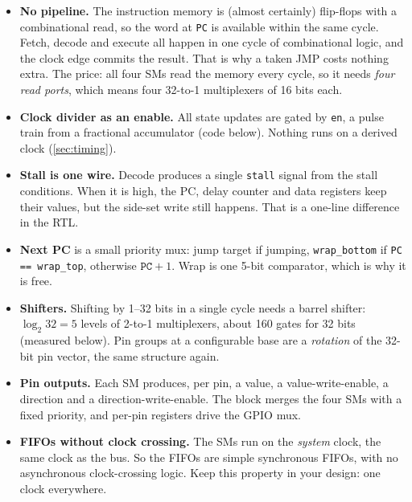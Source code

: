 \begin{itemize}
  \item \textbf{No pipeline.} The instruction memory is (almost certainly)
    flip-flops with a combinational read, so the word at \texttt{PC} is
    available within the same cycle. Fetch, decode and execute all happen
    in one cycle of combinational logic, and the clock edge commits the
    result. That is why a taken JMP costs nothing extra. The price: all
    four SMs read the memory every cycle, so it needs \emph{four read
    ports}, which means four 32-to-1 multiplexers of 16 bits each.
  \item \textbf{Clock divider as an enable.} All state updates are gated by
    \texttt{en}, a pulse train from a fractional accumulator (code below).
    Nothing runs on a derived clock (\cref{sec:timing}).
  \item \textbf{Stall is one wire.} Decode produces a single \texttt{stall}
    signal from the stall conditions. When it is high, the PC, delay
    counter and data registers keep their values, but the side-set write
    still happens. That is a one-line difference in the RTL.
  \item \textbf{Next PC} is a small priority mux: jump target if jumping,
    \texttt{wrap\_bottom} if \texttt{PC == wrap\_top}, otherwise
    $\texttt{PC}+1$. Wrap is one 5-bit comparator, which is why it is free.
  \item \textbf{Shifters.} Shifting by 1--32 bits in a single cycle needs a
    barrel shifter: $\log_2 32 = 5$ levels of 2-to-1 multiplexers, about
    160 gates for 32 bits (measured below). Pin groups at a configurable
    base are a \emph{rotation} of the 32-bit pin vector, the same structure
    again.
  \item \textbf{Pin outputs.} Each SM produces, per pin, a value, a
    value-write-enable, a direction and a direction-write-enable. The block
    merges the four SMs with a fixed priority, and per-pin registers drive
    the GPIO mux.
  \item \textbf{FIFOs without clock crossing.} The SMs run on the
    \emph{system} clock, the same clock as the bus. So the FIFOs are simple
    synchronous FIFOs, with no asynchronous clock-crossing logic. Keep this
    property in your design: one clock everywhere.
\end{itemize}

